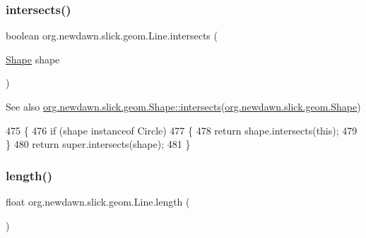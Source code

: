 \mbox{\label{classorg_1_1newdawn_1_1slick_1_1geom_1_1_line_a4a77fb0c2705cbc346a1df83701f39c4}} 
\subsubsection{\texorpdfstring{intersects()}{intersects()}}
{\footnotesize\ttfamily boolean org.\+newdawn.\+slick.\+geom.\+Line.\+intersects (\begin{DoxyParamCaption}\item[{\mbox{\hyperlink{classorg_1_1newdawn_1_1slick_1_1geom_1_1_shape}{Shape}}}]{shape }\end{DoxyParamCaption})\hspace{0.3cm}{\ttfamily [inline]}}

\begin{DoxySeeAlso}{See also}
\mbox{\hyperlink{classorg_1_1newdawn_1_1slick_1_1geom_1_1_shape_a5726456feb401f1cbd443b3f1faf0d40}{org.\+newdawn.\+slick.\+geom.\+Shape\+::intersects}}(\mbox{\hyperlink{classorg_1_1newdawn_1_1slick_1_1geom_1_1_shape}{org.\+newdawn.\+slick.\+geom.\+Shape}}) 
\end{DoxySeeAlso}

\begin{DoxyCode}
475     \{ 
476         \textcolor{keywordflow}{if} (shape instanceof Circle) 
477         \{ 
478             \textcolor{keywordflow}{return} shape.intersects(\textcolor{keyword}{this}); 
479         \} 
480         \textcolor{keywordflow}{return} super.intersects(shape); 
481     \}
\end{DoxyCode}
\mbox{\label{classorg_1_1newdawn_1_1slick_1_1geom_1_1_line_aae00113aea8d0d253962614a873f05a1}} 
\subsubsection{\texorpdfstring{length()}{length()}}
{\footnotesize\ttfamily float org.\+newdawn.\+slick.\+geom.\+Line.\+length (\begin{DoxyParamCaption}{ }\end{DoxyParamCaption})\hspace{0.3cm}{\ttfamily [inline]}}

